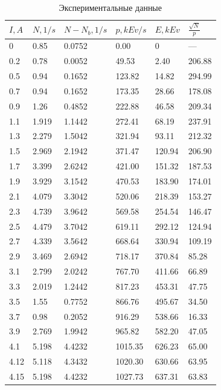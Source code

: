 \documentclass[a4paper,12pt]{article}
\begin{document}
    \begin{table}[h!]
\centering
\caption{Экспериментальные данные}
\label{my-label}
\begin{tabular}{|l|l|l|l|l|l|}
\hline
$I, A$    & $N, 1/s$   & $N-N_b, 1/s$ & $p, kEv/s$       & $E, kEv$      & $\frac{\sqrt{N}}{p}$ \\ \hline
0    & 0.85  & 0.0752  & 0.00    & 0      & ---     \\ \hline
0.2  & 0.78  & 0.0052  & 49.53   & 2.40   & 206.88  \\ \hline
0.5  & 0.94  & 0.1652  & 123.82  & 14.82  & 294.99  \\ \hline
0.7  & 0.94  & 0.1652  & 173.35  & 28.66  & 178.08  \\ \hline
0.9  & 1.26  & 0.4852  & 222.88  & 46.58  & 209.34  \\ \hline
1.1  & 1.919 & 1.1442  & 272.41  & 68.19  & 237.91  \\ \hline
1.3  & 2.279 & 1.5042  & 321.94  & 93.11  & 212.32  \\ \hline
1.5  & 2.969 & 2.1942  & 371.47  & 120.94 & 206.90  \\ \hline
1.7  & 3.399 & 2.6242  & 421.00  & 151.32 & 187.53  \\ \hline
1.9  & 3.929 & 3.1542  & 470.53  & 183.90 & 174.01  \\ \hline
2.1  & 4.079 & 3.3042  & 520.06  & 218.39 & 153.27  \\ \hline
2.3  & 4.739 & 3.9642  & 569.58  & 254.54 & 146.47  \\ \hline
2.5  & 4.479 & 3.7042  & 619.11  & 292.12 & 124.94  \\ \hline
2.7  & 4.339 & 3.5642  & 668.64  & 330.94 & 109.19  \\ \hline
2.9  & 3.469 & 2.6942  & 718.17  & 370.84 & 85.28   \\ \hline
3.1  & 2.799 & 2.0242  & 767.70  & 411.66 & 66.89   \\ \hline
3.3  & 2.019 & 1.2442  & 817.23  & 453.31 & 47.75   \\ \hline
3.5  & 1.55  & 0.7752  & 866.76  & 495.67 & 34.50   \\ \hline
3.7  & 0.98  & 0.2052  & 916.29  & 538.66 & 16.33   \\ \hline
3.9  & 2.769 & 1.9942  & 965.82  & 582.20 & 47.05   \\ \hline
4.1  & 5.198 & 4.4232  & 1015.35 & 626.23 & 65.00   \\ \hline
4.12 & 5.118 & 4.3432  & 1020.30 & 630.66 & 63.95   \\ \hline
4.15 & 5.198 & 4.4232  & 1027.73 & 637.31 & 63.83   \\ \hline

\end{tabular}
\end{table}
\end{document}
